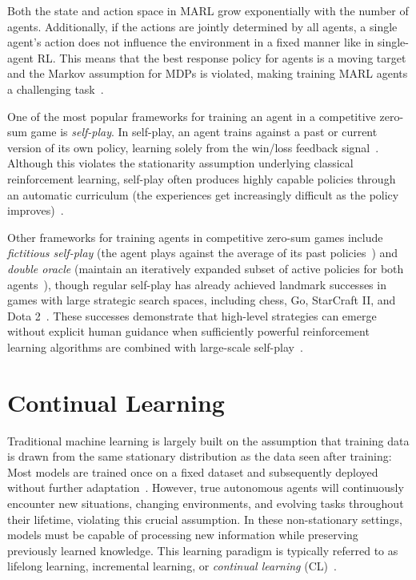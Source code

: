 Both the state and action space in MARL grow exponentially with the number of agents.
Additionally, if the actions are jointly determined by all agents, a single agent's action does not influence the environment in a fixed manner like in single-agent RL.
This means that the best response policy for agents is a moving target and the Markov assumption for MDPs is violated, making training MARL agents a challenging task~\cite{stefano2024marl,zhang2025selfplay}.

One of the most popular frameworks for training an agent in a competitive zero-sum game is \textit{self-play}. In self-play, an agent trains against a past or current version of its own policy, learning solely from the win/loss feedback signal~\cite{stefano2024marl,zhang2025selfplay}.
Although this violates the stationarity assumption underlying classical reinforcement learning, self-play often produces highly capable policies through an automatic curriculum (the experiences get increasingly difficult as the policy improves)~\cite{silver2017alphazero,zhang2025selfplay}.

Other frameworks for training agents in competitive zero-sum games include \textit{fictitious self-play} (the agent plays against the average of its past policies~\cite{heinrich2015fictitioussp}) and \textit{double oracle} (maintain an iteratively expanded subset of active policies for both agents~\cite{bosansky2014doubleoracle}), though regular self-play has already achieved landmark successes in games with large strategic search spaces, including chess, Go, StarCraft II, and Dota 2~\cite{silver2017alphazero,vinyals2019starcraft,berner2019dota}.
These successes demonstrate that high-level strategies can emerge without explicit human guidance when sufficiently powerful reinforcement learning algorithms are combined with large-scale self-play~\cite{silver2017alphazero}.

\section{Continual Learning} \label{sec:cl}
Traditional machine learning is largely built on the assumption that training data is drawn from the same stationary distribution as the data seen after training: Most models are trained once on a fixed dataset and subsequently deployed without further adaptation~\cite{khetarpal2022crl,wang2024cl}.
However, true autonomous agents will continuously encounter new situations, changing environments, and evolving tasks throughout their lifetime, violating this crucial assumption.
In these non-stationary settings, models must be capable of processing new information while preserving previously learned knowledge. 
This learning paradigm is typically referred to as lifelong learning, incremental learning, or \textit{continual learning} (CL)~\cite{wang2024cl}.

